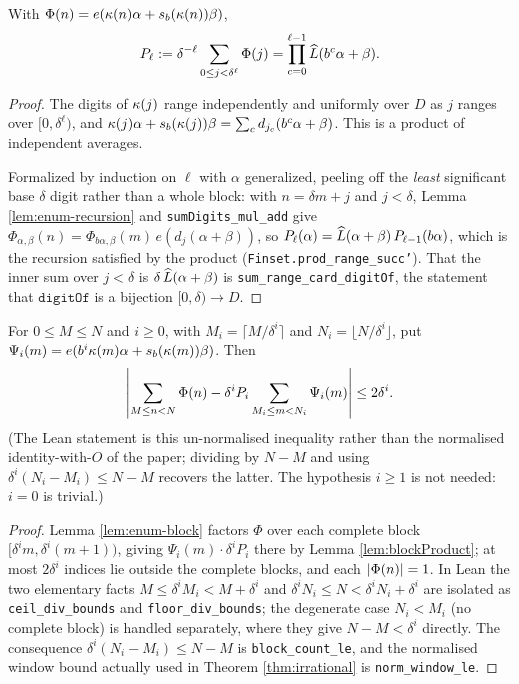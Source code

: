 \begin{lemma}
  \label{lem:blockProduct}
  \leanok
  With $\Phi(n) = e(\kappa(n)\alpha + s_b(\kappa(n))\beta)$,
  \[
    P_\ell := \delta^{-\ell} \sum_{0 \leq j < \delta^\ell} \Phi(j)
      = \prod_{c=0}^{\ell-1} \widehat{L}(b^c \alpha + \beta) .
  \]
\end{lemma}
\begin{proof}
  \leanok
  The digits of $\kappa(j)$ range independently and uniformly over $D$ as $j$
  ranges over $[0, \delta^\ell)$, and
  $\kappa(j)\alpha + s_b(\kappa(j))\beta = \sum_c d_{j_c}(b^c\alpha + \beta)$.
  This is a product of independent averages.

  Formalized by induction on $\ell$ with $\alpha$ generalized, peeling off the
  \emph{least} significant base $\delta$ digit rather than a whole block: with
  $n = \delta m + j$ and $j < \delta$, Lemma \ref{lem:enum-recursion} and
  \texttt{sumDigits\_mul\_add} give
  $\Phi_{\alpha,\beta}(n) = \Phi_{b\alpha,\beta}(m)\, e(d_j(\alpha + \beta))$,
  so $P_\ell(\alpha) = \widehat{L}(\alpha + \beta)\, P_{\ell-1}(b\alpha)$, which is
  the recursion satisfied by the product (\texttt{Finset.prod\_range\_succ'}).
  That the inner sum over $j < \delta$ is $\delta\,\widehat{L}(\alpha + \beta)$ is
  \texttt{sum\_range\_card\_digitOf}, the statement that $\texttt{digitOf}$ is a
  bijection $[0,\delta) \to D$.
\end{proof}

\begin{lemma}
  \label{lem:windowSplit}
  \leanok
  For $0 \leq M \leq N$ and $i \geq 0$, with
  $M_i = \lceil M/\delta^i \rceil$ and $N_i = \lfloor N/\delta^i \rfloor$, put
  $\Psi_i(m) = e(b^i \kappa(m)\alpha + s_b(\kappa(m))\beta)$.  Then
  \[
    \left\lvert \sum_{M \leq n < N} \Phi(n)
      - \delta^i P_i \sum_{M_i \leq m < N_i} \Psi_i(m) \right\rvert \leq 2\delta^i .
  \]
  (The Lean statement is this un-normalised inequality rather than the
  normalised identity-with-$O$ of the paper; dividing by $N - M$ and using
  $\delta^i(N_i - M_i) \leq N - M$ recovers the latter.  The hypothesis
  $i \geq 1$ is not needed: $i = 0$ is trivial.)
\end{lemma}
\begin{proof}
  \leanok
  Lemma \ref{lem:enum-block} factors $\Phi$ over each complete block
  $[\delta^i m, \delta^i(m+1))$, giving $\Psi_i(m) \cdot \delta^i P_i$ there
  by Lemma \ref{lem:blockProduct}; at most $2\delta^i$ indices lie outside
  the complete blocks, and each $\left\lvert \Phi(n) \right\rvert = 1$.  In Lean the two
  elementary facts $M \leq \delta^i M_i < M + \delta^i$ and
  $\delta^i N_i \leq N < \delta^i N_i + \delta^i$ are isolated as
  \texttt{ceil\_div\_bounds} and \texttt{floor\_div\_bounds}; the degenerate
  case $N_i < M_i$ (no complete block) is handled separately, where they give
  $N - M < \delta^i$ directly.  The consequence
  $\delta^i(N_i - M_i) \leq N - M$ is \texttt{block\_count\_le}, and the
  normalised window bound actually used in Theorem \ref{thm:irrational} is
  \texttt{norm\_window\_le}.
\end{proof}

